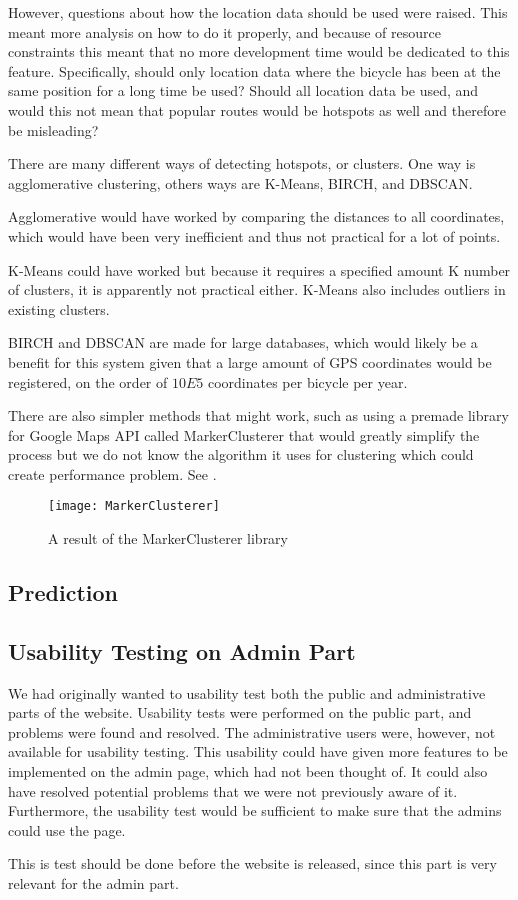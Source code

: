 However, questions about how the location data should be used were raised.
This meant more analysis on how to do it properly, and because of resource constraints this meant that no more development time would be dedicated to this feature. 
Specifically, should only location data where the bicycle has been at the same position for a long time be used? 
Should all location data be used, and would this not mean that popular routes would be hotspots as well and therefore be misleading? 

There are many different ways of detecting hotspots, or clusters. One way is agglomerative clustering, others ways are K-Means, BIRCH, and DBSCAN.

Agglomerative would have worked by comparing the distances to all coordinates, which would have been very inefficient and thus not practical for a lot of points. 

K-Means could have worked but because it requires a specified amount K number of clusters, it is apparently not practical either. K-Means also includes outliers in existing clusters.

BIRCH and DBSCAN are made for large databases, which would likely be a benefit for this system given that a large amount of GPS coordinates would be registered, on the order of $10E5$ coordinates per bicycle per year. 

There are also simpler methods that might work, such as using a premade library for Google Maps API called MarkerClusterer that would greatly simplify the process but we do not know the algorithm it uses for clustering which could create performance problem. See .

\begin{figure}[h]
\begin{center}
\texttt{[image: MarkerClusterer]}
\caption{A result of the MarkerClusterer library}
\label{fig:markerclusterer}
\end{center}
\end{figure}

\subsection{Prediction}

\subsection{Usability Testing on Admin Part}
We had originally wanted to usability test both the public and administrative parts of the website.
Usability tests were performed on the public part, and problems were found and resolved. 
The administrative users were, however, not available for usability testing.
This usability could have given more features to be implemented on the admin page, which had not been thought of.
It could also have resolved potential problems that we were not previously aware of it.
Furthermore, the usability test would be sufficient to make sure that the admins could use the page.

This is test should be done before the website is released, since this part is very relevant for the admin part.